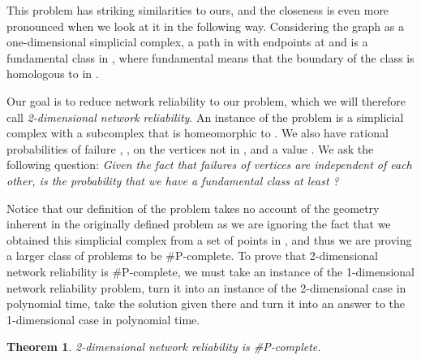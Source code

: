 \documentclass[10pt,twocolumn]{article} \usepackage{amsmath,epsf,amssymb,cite,pifont,amsthm, mathrsfs,epsfig,  bbm, amsthm,  setspace}
\newtheorem{thm}{Theorem}
\renewcommand{\1}{\mathbbm{1}}
\begin{document}
This problem has striking similarities to ours, and the closeness is even more pronounced
when we look at it in the following way.
Considering the graph  as a one-dimensional simplicial complex, a path in  with
endpoints at  and  is a fundamental class in ,
where fundamental means that the boundary of the class is homologous to  in
.


Our goal is to reduce network reliability to our problem, which we will therefore call
{\em 2-dimensional network reliability}.
An instance of the problem is a simplicial complex  with a subcomplex
 that is homeomorphic to .
We also have rational probabilities of failure , , on the  vertices not in ,
and a value .
We ask the following question:
{\em Given the fact that failures of vertices are independent of each other, is the probability
that we have a fundamental class  at least ?}

Notice that our definition of the problem takes no account of the geometry inherent in the
originally defined problem
as we are ignoring the fact that we obtained this simplicial complex from a set of points in , and thus we are proving a larger class of problems to be \#P-complete.
To prove that 2-dimensional network reliability is \#P-complete, we must take an instance of the
1-dimensional network reliability problem, turn it into an instance of the 2-dimensional case in
polynomial time, take the solution given there and turn it into an answer to the 1-dimensional
case in polynomial time.


\begin{thm}
2-dimensional network reliability is \#P-complete.
\end{thm}
\end{document}
